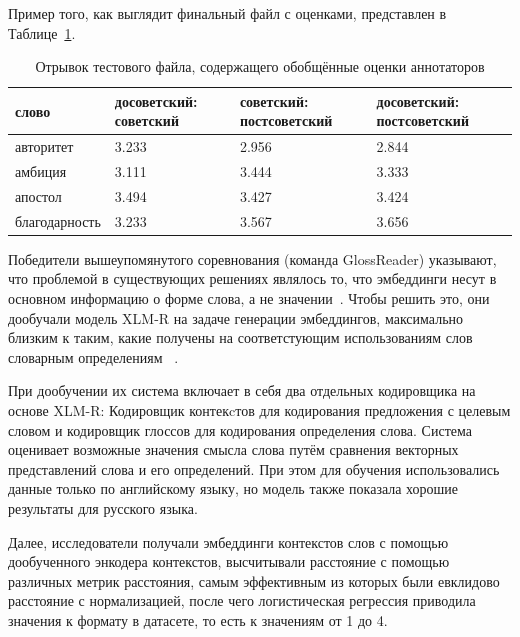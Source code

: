 \documentclass[LI,VKR]{HSEUniversity}
\begin{document}
Пример того, как выглядит финальный файл с оценками, представлен в Таблице~\ref{tab:goldset_rushifteval}.

\begin{table}[H]
\centering
\caption{Отрывок тестового файла, содержащего обобщённые оценки аннотаторов}
\label{tab:goldset_rushifteval}
\begin{tabular}{|l|p{2.75cm}|p{2.75cm}|p{2.75cm}|}
\hline
\textbf{слово} & \textbf{досоветский: советский} & \textbf{советский: постсоветский} & \textbf{досоветский: постсоветский} \\
\hline
авторитет & 3.233 & 2.956 & 2.844 \\
\hline
амбиция & 3.111 & 3.444 & 3.333 \\
\hline
апостол & 3.494 & 3.427 & 3.424 \\
\hline
благодарность & 3.233 & 3.567 & 3.656 \\
\hline
\end{tabular}
\end{table}

Победители вышеупомянутого соревнования (команда GlossReader) указывают,
что проблемой в существующих решениях являлось то,
что эмбеддинги несут в основном информацию о форме слова, а не значении~\cite{GlossReader}.
Чтобы решить это, они дообучали модель XLM-R на задаче генерации эмбеддингов, максимально близким
к таким, какие получены на соответстующим использованиям слов словарным определениям
~\cite{XLM-R}.

При дообучении их система включает в себя два отдельных кодировщика на основе XLM-R:
Кодировщик контекcтов для кодирования предложения с целевым словом и
кодировщик глоссов для кодирования определения слова.
Система оценивает возможные значения смысла слова путём сравнения векторных представлений слова
и его определений.
При этом для обучения использовались данные только по английскому языку,
но модель также показала хорошие результаты для русского языка.

Далее, исследователи получали эмбеддинги контекстов слов с помощью
дообученного энкодера контекстов, высчитывали расстояние с помощью различных метрик расстояния,
самым эффективным из которых были евклидово расстояние с нормализацией, после чего
логистическая регрессия приводила значения к формату в датасете, то есть к значениям от 1 до 4.

\end{document}
